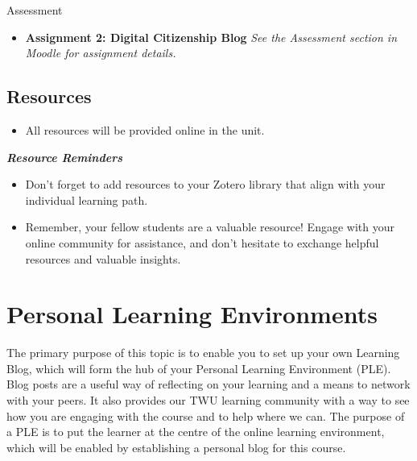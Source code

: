 \documentclass[
]{book}
\providecommand{\tightlist}{%
  \setlength{\itemsep}{0pt}\setlength{\parskip}{0pt}}
\theoremstyle{definition}
\theoremstyle{definition}
\theoremstyle{definition}
\theoremstyle{definition}
\theoremstyle{remark}
\begin{document}
\begin{assessment}
{Assessment}

\begin{itemize}
\tightlist
\item
  \textbf{Assignment 2: Digital Citizenship Blog}
  \emph{See the Assessment section in Moodle for assignment details.}
\end{itemize}
\end{assessment}

\hypertarget{resources-3}{%
\subsection*{Resources}\label{resources-3}}

\begin{itemize}
\tightlist
\item
  All resources will be provided online in the unit.
\end{itemize}

\begin{feedback}
\textbf{\emph{Resource Reminders}}

\begin{itemize}
\tightlist
\item
  Don't forget to add resources to your Zotero library that align with
  your individual learning path.\\
\item
  Remember, your fellow students are a valuable resource! Engage with
  your online community for assistance, and don't hesitate to exchange
  helpful resources and valuable insights.
\end{itemize}
\end{feedback}

\hypertarget{personal-learning-environments}{%
\section{Personal Learning Environments}\label{personal-learning-environments}}

The primary purpose of this topic is to enable you to set up your own Learning Blog, which will form the hub of your Personal Learning Environment (PLE). Blog posts are a useful way of reflecting on your learning and a means to network with your peers. It also provides our TWU learning community with a way to see how you are engaging with the course and to help where we can. The purpose of a PLE is to put the learner at the centre of the online learning environment, which will be enabled by establishing a personal blog for this course.
\end{document}
